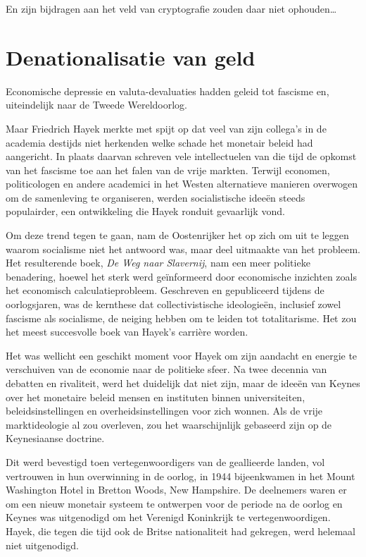 \documentclass[
  a5paper,
  smalldemyvopaper,11pt,twoside,onecolumn,openright,extrafontsizes]{memoir}
\begin{document}
En zijn bijdragen aan het veld van cryptografie zouden daar niet
ophouden\ldots{}

\chapter{Denationalisatie van geld}\label{denationalisatie-van-geld}

Economische depressie en valuta-devaluaties hadden geleid tot fascisme
en, uiteindelijk naar de Tweede Wereldoorlog.

Maar Friedrich Hayek merkte met spijt op dat veel van zijn collega's in
de academia destijds niet herkenden welke schade het monetair beleid had
aangericht. In plaats daarvan schreven vele intellectuelen van die tijd
de opkomst van het fascisme toe aan het falen van de vrije markten.
Terwijl economen, politicologen en andere academici in het Westen
alternatieve manieren overwogen om de samenleving te organiseren, werden
socialistische ideeën steeds populairder, een ontwikkeling die Hayek
ronduit gevaarlijk vond.

Om deze trend tegen te gaan, nam de Oostenrijker het op zich om uit te
leggen waarom socialisme niet het antwoord was, maar deel uitmaakte van
het probleem. Het resulterende boek, \emph{De Weg naar Slavernij}, nam
een meer politieke benadering, hoewel het sterk werd geïnformeerd door
economische inzichten zoals het economisch calculatieprobleem.
Geschreven en gepubliceerd tijdens de oorlogsjaren, was de kernthese dat
collectivistische ideologieën, inclusief zowel fascisme als socialisme,
de neiging hebben om te leiden tot totalitarisme. Het zou het meest
succesvolle boek van Hayek's carrière worden.

Het was wellicht een geschikt moment voor Hayek om zijn aandacht en
energie te verschuiven van de economie naar de politieke sfeer. Na twee
decennia van debatten en rivaliteit, werd het duidelijk dat niet zijn,
maar de ideeën van Keynes over het monetaire beleid mensen en instituten
binnen universiteiten, beleidsinstellingen en overheidsinstellingen voor
zich wonnen. Als de vrije marktideologie al zou overleven, zou het
waarschijnlijk gebaseerd zijn op de Keynesiaanse doctrine.

Dit werd bevestigd toen vertegenwoordigers van de geallieerde landen,
vol vertrouwen in hun overwinning in de oorlog, in 1944 bijeenkwamen in
het Mount Washington Hotel in Bretton Woods, New Hampshire. De
deelnemers waren er om een nieuw monetair systeem te ontwerpen voor de
periode na de oorlog en Keynes was uitgenodigd om het Verenigd
Koninkrijk te vertegenwoordigen. Hayek, die tegen die tijd ook de Britse
nationaliteit had gekregen, werd helemaal niet uitgenodigd.
\end{document}
